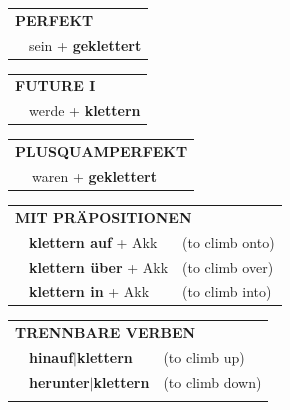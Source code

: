 \documentclass[10pt,a4paper]{revtex4-2}
\begin{document}
\begin{verbbox}
 \begin{tabular}{rl}
     \multicolumn{2}{l}{\textbf{PERFEKT}}\\
   & sein + \textbf{geklettert}\\
  \end{tabular}
\hfill
   \begin{tabular}{rl}
    \multicolumn{2}{l}{\textbf{FUTURE I} }\\
   & werde + \textbf{klettern}\\
  \end{tabular}
\hfill
   \begin{tabular}{rl}
      \multicolumn{2}{l}{\textbf{PLUSQUAMPERFEKT}}\\
   & waren + \textbf{geklettert}\\
  \end{tabular}

   \vspace{10pt}

   \begin{tabular}{lll}
      \multicolumn{3}{l}{\textbf{MIT PRÄPOSITIONEN}}\\
& \textbf{klettern auf} + Akk & (to climb onto)\\
& \textbf{klettern über} + Akk & (to climb over)\\
& \textbf{klettern in} + Akk & (to climb into)\\
\end{tabular}
  \hfill
   \begin{tabular}{lll}
      \multicolumn{3}{l}{\textbf{TRENNBARE VERBEN}}\\
 & \textbf{hinauf$|$klettern} & (to climb up)\\
 & \textbf{herunter$|$klettern} & (to climb down)\\
\vspace{10pt}
  \end{tabular}

  \vspace{-5pt}

\end{verbbox}
\end{document}
